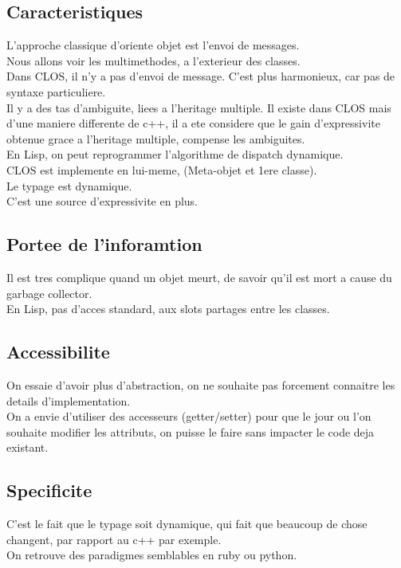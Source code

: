 \documentclass[a4paper,11pt]{article}
\begin{document}
\subsection{Caracteristiques}
L'approche classique d'oriente objet est l'envoi de messages.\\
Nous allons voir les multimethodes, a l'exterieur des classes.\\
Dans CLOS, il n'y a pas d'envoi de message. C'est plus harmonieux, car pas de syntaxe particuliere.\\
Il y a des tas d'ambiguite, liees a l'heritage multiple. Il existe dans CLOS mais d'une maniere differente de c++, il a ete considere que le gain d'expressivite obtenue grace a l'heritage multiple, compense les ambiguites.\\
En Lisp, on peut reprogrammer l'algorithme de dispatch dynamique.\\

CLOS est implemente en lui-meme, (Meta-objet et 1ere classe).\\
Le typage est dynamique.\\
C'est une source d'expressivite en plus.\\

\subsection{Portee de l'inforamtion}
Il est tres complique quand un objet meurt, de savoir qu'il est mort a cause du garbage collector.\\
En Lisp, pas d'acces standard, aux slots partages entre les classes.

\subsection{Accessibilite}
On essaie d'avoir plus d'abstraction, on ne souhaite pas forcement connaitre les details d'implementation.\\
On a envie d'utiliser des accesseurs (getter/setter) pour que le jour ou l'on souhaite modifier les attributs, on puisse le faire sans impacter le code deja existant.\\
\subsection{Specificite}
C'est le fait que le typage soit dynamique, qui fait que beaucoup de chose changent, par rapport au c++ par exemple.\\
On retrouve des paradigmes semblables en ruby ou python.\\
\end{document}
